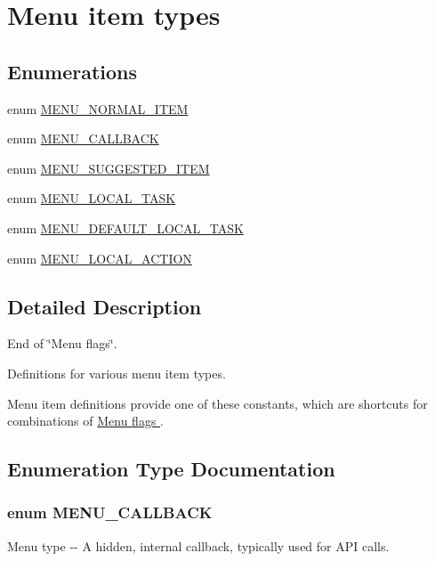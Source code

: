 \hypertarget{group__menu__item__types}{
\section{Menu item types}
\label{group__menu__item__types}
}
\subsection*{Enumerations}
\begin{DoxyCompactItemize}
\item 
enum \hyperlink{group__menu__item__types_gac42144282c42a943b05511b38c451e4c}{MENU\_\-NORMAL\_\-ITEM} 
\item 
enum \hyperlink{group__menu__item__types_ga92850b428279a637ce9bac5c1757700f}{MENU\_\-CALLBACK} 
\item 
enum \hyperlink{group__menu__item__types_ga0860a2534ce61dc1334dc7ede68e20b3}{MENU\_\-SUGGESTED\_\-ITEM} 
\item 
enum \hyperlink{group__menu__item__types_ga4dc67226400f237bd3c0a5ef7126008b}{MENU\_\-LOCAL\_\-TASK} 
\item 
enum \hyperlink{group__menu__item__types_ga251e324e062f2e4c703f51231c0d7dc5}{MENU\_\-DEFAULT\_\-LOCAL\_\-TASK} 
\item 
enum \hyperlink{group__menu__item__types_gac627fc26dd1719748fa8aec50300ef16}{MENU\_\-LOCAL\_\-ACTION} 
\end{DoxyCompactItemize}


\subsection{Detailed Description}
End of \char`\"{}Menu flags\char`\"{}.

Definitions for various menu item types.

Menu item definitions provide one of these constants, which are shortcuts for combinations of \hyperlink{group__menu__flags}{Menu flags }. 

\subsection{Enumeration Type Documentation}
\hypertarget{group__menu__item__types_ga92850b428279a637ce9bac5c1757700f}{
\subsubsection[{MENU\_\-CALLBACK}]{\setlength{\rightskip}{0pt plus 5cm}enum {\bf MENU\_\-CALLBACK}}}
\label{group__menu__item__types_ga92850b428279a637ce9bac5c1757700f}
Menu type -\/-\/ A hidden, internal callback, typically used for API calls.

